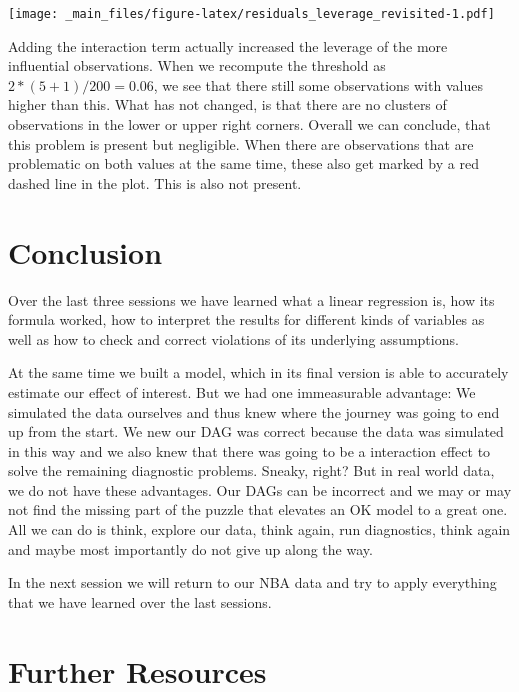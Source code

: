 \documentclass[
]{book}
\begin{document}
\texttt{[image: \_main\_files/figure-latex/residuals\_leverage\_revisited-1.pdf]}

Adding the interaction term actually increased the leverage of the more
influential observations. When we recompute the threshold as
\(2 * (5 + 1) / 200 = 0.06\), we see that there still some observations with
values higher than this. What has not changed, is that there are no clusters
of observations in the lower or upper right corners. Overall we can conclude,
that this problem is present but negligible. When there are observations that
are problematic on both values at the same time, these also get marked by a red
dashed line in the plot. This is also not present.

\hypertarget{conclusion}{%
\section{Conclusion}\label{conclusion}}

Over the last three sessions we have learned what a linear regression is, how
its formula worked, how to interpret the results for different kinds of
variables as well as how to check and correct violations of its underlying
assumptions.

At the same time we built a model, which in its final version is able to
accurately estimate our effect of interest. But we had one immeasurable
advantage: We simulated the data ourselves and thus knew where the journey was
going to end up from the start. We new our DAG was correct because the data was
simulated in this way and we also knew that there was going to be a interaction
effect to solve the remaining diagnostic problems. Sneaky, right? But in real
world data, we do not have these advantages. Our DAGs can be incorrect and we
may or may not find the missing part of the puzzle that elevates an OK model to
a great one. All we can do is think, explore our data, think again, run
diagnostics, think again and maybe most importantly do not give up along the
way.

In the next session we will return to our NBA data and try to apply everything
that we have learned over the last sessions.

\hypertarget{further-resources-4}{%
\section{Further Resources}\label{further-resources-4}}
\end{document}
